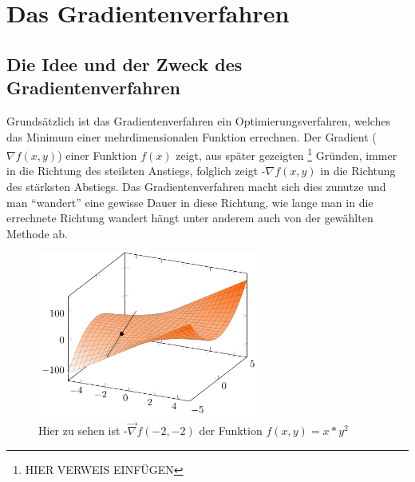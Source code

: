 \documentclass[naustrian]{article}
\begin{document}
{\section{Das Gradientenverfahren}

\subsection{Die Idee und der Zweck des Gradientenverfahren}

Grundsätzlich ist das Gradientenverfahren ein Optimierungsverfahren, welches
das Minimum einer mehrdimensionalen Funktion errechnen. Der Gradient
(${\nabla}f(x,y)$) einer Funktion \(f(x)\) zeigt, aus später gezeigten
\footnote{HIER VERWEIS EINFÜGEN} Gründen, immer in die Richtung des steilsten
Anstiegs, folglich zeigt -${\nabla}f(x,y)$ in die Richtung des stärksten
Abstiegs. Das Gradientenverfahren macht sich dies zunutze und man ``wandert''
eine gewisse Dauer in diese Richtung, wie \textquotedbl{}lange\textquotedbl{}
man in die errechnete Richtung \textquotedbl{}wandert\textquotedbl{} hängt
unter anderem auch von der gewählten Methode ab.

\begin{figure}[H]
    \centering
    \includegraphics[width=0.65\textwidth]{grad/figure0}
    \caption[Gradientenvektor Beispiel] {Hier zu sehen ist -$\vec{\nabla}f(-2,-2)$ der Funktion $f(x,y)=x*y^2$}
\end{figure}

}
\end{document}
